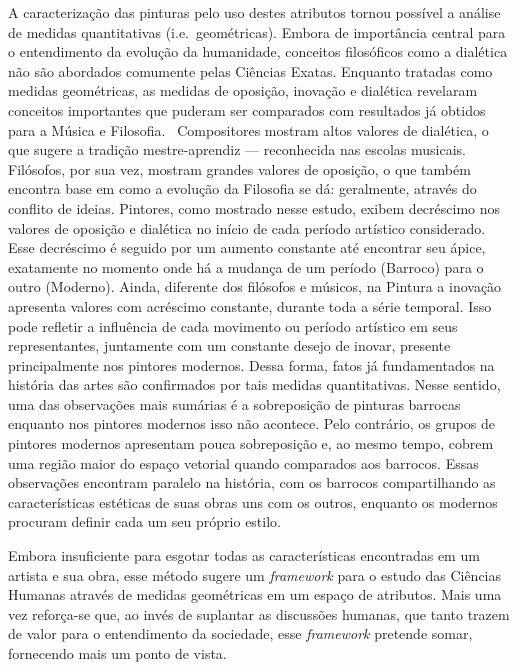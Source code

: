 A caracterização das pinturas pelo uso destes atributos tornou
possível a análise de medidas quantitativas (i.e.\ geométricas). Embora de
importância central para o entendimento da evolução da humanidade,
conceitos filosóficos como a dialética não são abordados comumente
pelas Ciências Exatas. Enquanto tratadas como medidas geométricas, as
medidas de oposição, inovação e dialética revelaram conceitos
importantes que puderam ser comparados com resultados já obtidos para
a Música e Filosofia.~\cite{vieira} Compositores mostram altos valores
de dialética, o que sugere a tradição mestre-aprendiz --- reconhecida
nas escolas musicais. Filósofos, por sua vez, mostram grandes valores
de oposição, o que também encontra base em como a evolução da
Filosofia se dá: geralmente, através do conflito de ideias. Pintores,
como mostrado nesse estudo, exibem decréscimo nos valores de oposição
e dialética no início de cada período artístico considerado. Esse
decréscimo é seguido por um aumento constante até encontrar seu ápice,
exatamente no momento onde há a mudança de um período (Barroco) para o
outro (Moderno). Ainda, diferente dos filósofos e músicos, na Pintura
a inovação apresenta valores com acréscimo constante, durante toda a
série temporal. Isso pode refletir a influência de cada movimento ou
período artístico em seus representantes, juntamente com um constante
desejo de inovar, presente principalmente nos pintores modernos. Dessa
forma, fatos já fundamentados na história das artes são confirmados
por tais medidas quantitativas. Nesse sentido, uma das observações
mais sumárias é a sobreposição de pinturas barrocas enquanto nos
pintores modernos isso não acontece. Pelo contrário, os grupos de
pintores modernos apresentam pouca sobreposição e, ao mesmo tempo,
cobrem uma região maior do espaço vetorial quando comparados aos
barrocos. Essas observações encontram paralelo na história, com os
barrocos compartilhando as características estéticas de suas obras uns
com os outros, enquanto os modernos procuram definir cada um seu
próprio estilo.

Embora insuficiente para esgotar todas as características encontradas
em um artista e sua obra, esse método sugere um \textit{framework}
para o estudo das Ciências Humanas através de medidas geométricas em
um espaço de atributos. Mais uma vez reforça-se que, ao invés de
suplantar as discussões humanas, que tanto trazem de valor para o
entendimento da sociedade, esse \textit{framework} pretende somar,
fornecendo mais um ponto de vista.

